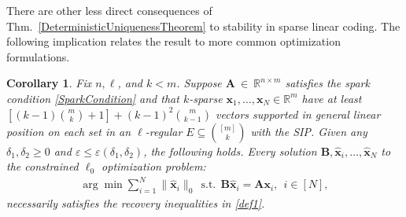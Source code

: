 \documentclass[9pt,twocolumn]{pnas-new}
\newtheorem{corollary}{Corollary}
\begin{document}
There are other less direct consequences of Thm.~\ref{DeterministicUniquenessTheorem} to stability in sparse linear coding.  The following implication relates the result to more common optimization formulations.

\begin{corollary}
Fix $n, \ell$, and $k < m$. Suppose $\mathbf{A}~\in~\mathbb{R}^{n \times m}$ satisfies the spark condition \eqref{SparkCondition} and that $k$-sparse \mbox{$\mathbf{x}_1, \ldots, \mathbf{x}_N \in \mathbb{R}^m$} have at least \mbox{$\left[ (k-1){ m \choose k} + 1 \right] + (k-1)^2{m \choose k-1}$} vectors supported in general linear position on each set in an $\ell$-regular $E \subseteq {[m] \choose k}$ with the SIP. Given any $\delta_1, \delta_2 \geq 0$ and $\varepsilon \leq \varepsilon(\delta_1, \delta_2)$, the following holds.  %
Every solution $\mathbf{B}, \mathbf{\hat x}_i, \ldots, \mathbf{\hat x}_N$ to the constrained $\ell_0$ optimization problem:
\begin{align}\label{minsum}
\arg \min \sum_{i = 1}^N \|\mathbf{\hat x}_i\|_0 \ \ \text{s.t.} \ \ \mathbf{B}\mathbf{\hat x}_i = \mathbf{A}\mathbf{x}_i, \ \ \text{$i \in [N]$}, %
\end{align}
necessarily satisfies the recovery inequalities in \eqref{def1}. %
\end{corollary}
\end{document}
